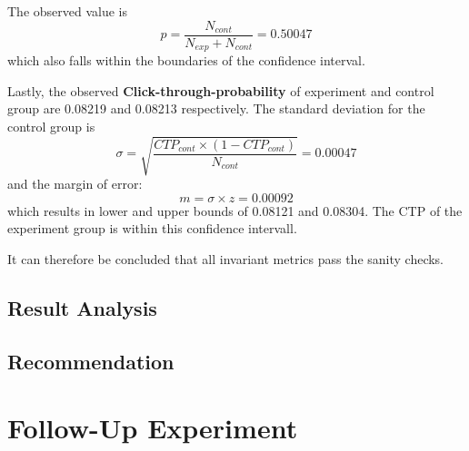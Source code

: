 \documentclass[11pt]{article} %
\begin{document}
The observed value is 
\begin{equation}
	p = \frac{N_{cont}}{N_{exp}+N_{cont}} = 0.50047
\end{equation}
which also falls within the boundaries of the confidence interval.\medskip

Lastly, the observed \textbf{Click-through-probability} of experiment and control group are 0.08219 and 0.08213 respectively. The standard deviation for the control group is
\begin{equation}
	\sigma = \sqrt{\frac{CTP_{cont}\times (1-CTP_{cont})}{N_{cont}}} = 0.00047
\end{equation}
and the margin of error:
\begin{equation}
	m = \sigma \times z = 0.00092
\end{equation}
which results in lower and upper bounds of 0.08121 and 0.08304. The CTP of the experiment group is within this confidence intervall.\medskip

It can therefore be concluded that all invariant metrics pass the sanity checks.

\subsection{Result Analysis}

\subsection{Recommendation}

\section{Follow-Up Experiment}
\end{document}
